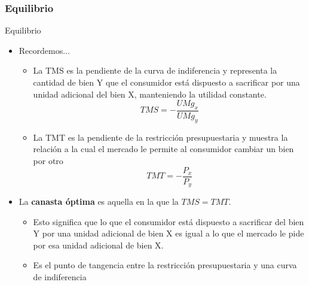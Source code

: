 \documentclass{beamer}
\begin{document}
\begin{frame}
\frametitle{Equilibrio}
\begin{center}
\end{center}
\end{frame}

\begin{frame}{Equilibrio}
    \begin{itemize}
    \item Recordemos...
    \begin{itemize}
    \footnotesize
    \item La TMS es la pendiente de la curva de indiferencia y representa la cantidad de bien Y que el consumidor está dispuesto a sacrificar por una unidad adicional del bien X, manteniendo la utilidad constante.
     \[TMS = - \frac{UMg_x}{UMg_y}\]
     \item La TMT es la pendiente de la restricción presupuestaria y muestra la relación a la cual el mercado le permite al consumidor cambiar un bien por otro
    \[TMT = - \frac{P_x}{P_y}\]
    \end{itemize}
     \normalsize
        \item La \textbf{canasta óptima} es aquella en la que la $TMS = TMT$. 
    \begin{itemize}
    \item Esto significa que lo que el consumidor está dispuesto a sacrificar del bien Y por una unidad adicional de bien X es igual a lo que el mercado le pide por esa unidad adicional de bien X.
    \item Es el punto de tangencia entre la restricción presupuestaria y una curva de indiferencia
    \end{itemize}
    \end{itemize}
\end{frame}
\end{document}
